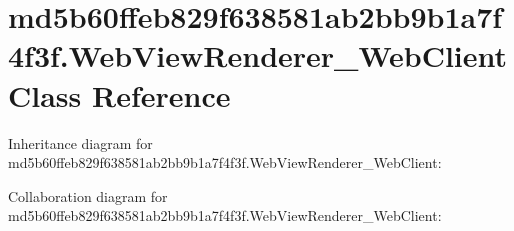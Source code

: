 \hypertarget{classmd5b60ffeb829f638581ab2bb9b1a7f4f3f_1_1_web_view_renderer___web_client}{}\section{md5b60ffeb829f638581ab2bb9b1a7f4f3f.\+Web\+View\+Renderer\+\_\+\+Web\+Client Class Reference}
\label{classmd5b60ffeb829f638581ab2bb9b1a7f4f3f_1_1_web_view_renderer___web_client}


Inheritance diagram for md5b60ffeb829f638581ab2bb9b1a7f4f3f.\+Web\+View\+Renderer\+\_\+\+Web\+Client\+:


Collaboration diagram for md5b60ffeb829f638581ab2bb9b1a7f4f3f.\+Web\+View\+Renderer\+\_\+\+Web\+Client\+:
